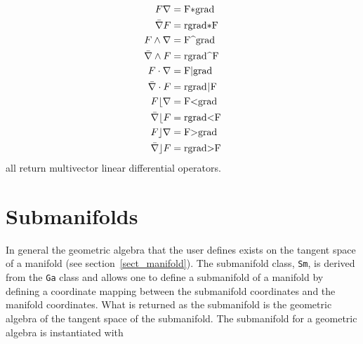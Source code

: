 \documentclass[12pt,twoside,openright]{memoir}
\newcommand{\W}{\wedge}
\newcommand{\T}[1]{\texttt{#1}}
\begin{document}
      \begin{align}
            F \nabla &=  \mbox{\lstinline!F*grad!} \\
            \bar{\nabla} F &=  \mbox{\lstinline!rgrad*F!} \\
            F \W \nabla &=  \mbox{\lstinline!F^grad!} \\
            \bar{\nabla} \W F &=  \mbox{\lstinline!rgrad^F!} \\
            F \cdot \nabla &=  \mbox{\lstinline!F|grad!} \\
            \bar{\nabla}\cdot F &=  \mbox{\lstinline!rgrad|F!} \\
            F \lfloor \nabla &=  \mbox{\lstinline!F<grad!} \\
            \bar{\nabla} \lfloor F &=  \mbox{\lstinline!rgrad<F!} \\
            F \rfloor \nabla &=  \mbox{\lstinline!F>grad!} \\
            \bar{\nabla} \rfloor F &= \mbox{\lstinline!rgrad>F!}
      \end{align}
all return multivector linear differential operators.

\section{Submanifolds}

In general the geometric algebra that the user defines exists on the tangent space of
a manifold (see section~\ref{sect_manifold}).  The submanifold class, \T{Sm}, is derived from
the \T{Ga} class and allows one
to define a submanifold of a manifold by defining a coordinate mapping between the submanifold
coordinates and the manifold coordinates.  What is returned as the submanifold is the geometric
algebra of the tangent space of the submanifold. The submanifold for a geometric algebra is
instantiated with
\end{document}
